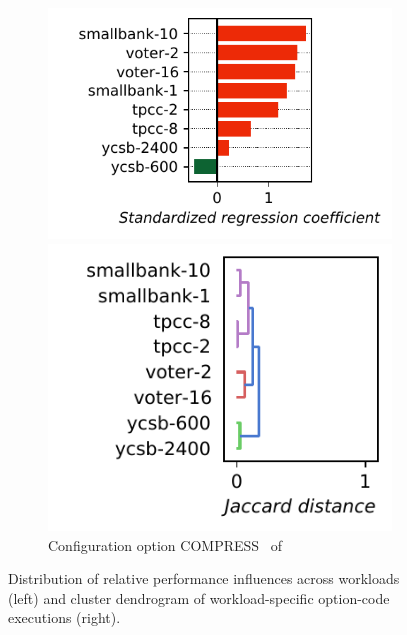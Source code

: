 \begin{figure}
	\begin{subfigure}{0.99\linewidth}
		\begin{minipage}{0.5\linewidth}
			\includegraphics[width=\linewidth]{images/plots/h2_MVSTORE_influences.pdf}
		\end{minipage}
		\begin{minipage}{0.5\linewidth}
			\includegraphics[width=0.9\linewidth]{images/plots/h2_MVSTORE_workloads.pdf}
		\end{minipage}
		\caption{Configuration option \guillemotleft\textsf{COMPRESS}\guillemotright~ of \htwo}
		\label{fig:results_rq3_h2}
	\end{subfigure}
	\caption{Distribution of relative performance influences across workloads (left) and cluster dendrogram of workload-specific option-code executions (right).}
	\label{fig:results_rq3}
\end{figure}

